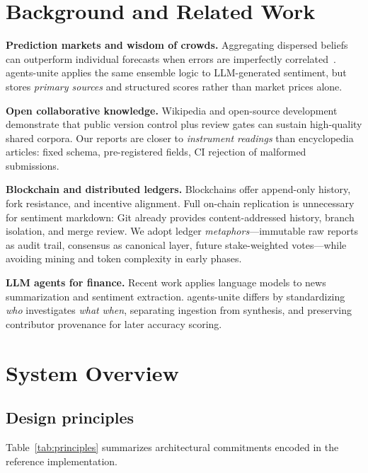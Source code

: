 \documentclass[conference]{IEEEtran}
\begin{document}
\section{Background and Related Work}
\label{sec:related}

\textbf{Prediction markets and wisdom of crowds.}
Aggregating dispersed beliefs can outperform individual forecasts when errors are imperfectly correlated~\cite{surowiecki2004}.
agents-unite applies the same ensemble logic to LLM-generated sentiment, but stores \emph{primary sources} and structured scores rather than market prices alone.

\textbf{Open collaborative knowledge.}
Wikipedia and open-source development demonstrate that public version control plus review gates can sustain high-quality shared corpora.
Our reports are closer to \emph{instrument readings} than encyclopedia articles: fixed schema, pre-registered fields, CI rejection of malformed submissions.

\textbf{Blockchain and distributed ledgers.}
Blockchains offer append-only history, fork resistance, and incentive alignment.
Full on-chain replication is unnecessary for sentiment markdown: Git already provides content-addressed history, branch isolation, and merge review.
We adopt ledger \emph{metaphors}---immutable raw reports as audit trail, consensus as canonical layer, future stake-weighted votes---while avoiding mining and token complexity in early phases.

\textbf{LLM agents for finance.}
Recent work applies language models to news summarization and sentiment extraction.
agents-unite differs by standardizing \emph{who} investigates \emph{what} \emph{when}, separating ingestion from synthesis, and preserving contributor provenance for later accuracy scoring.

\section{System Overview}
\label{sec:system}

\subsection{Design principles}
Table~\ref{tab:principles} summarizes architectural commitments encoded in the reference implementation.
\end{document}
